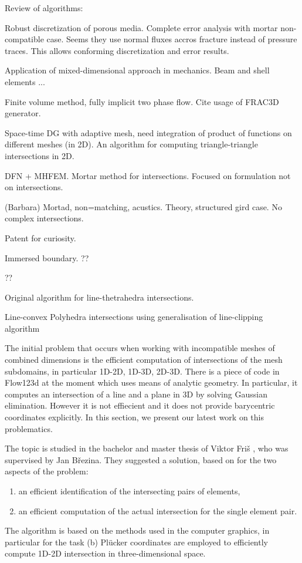 \documentclass{elsarticle}
\newcommand{\plucker}{Pl\"{u}cker }
\begin{document}
Review of algorithms: \cite{gander_algorithm_2009}
 

\cite{boon_robust_2016} Robust discretization of porous media. Complete error analysis with mortar non-compatible case. Seems they use normal fluxes accros
fracture instead of pressure traces. This allows conforming discretization and error results.


\cite{bournival_mesh-geometry_2008} Application of mixed-dimensional approach in mechanics. Beam and shell elements ...

\cite{reichenberger_mixed-dimensional_2006} Finite volume method, fully implicit two phase flow. Cite usage of FRAC3D generator. 

\cite{sladkova_bakalarka} Space-time DG with adaptive mesh, need integration of product of functions on different meshes (in 2D). An algorithm 
for computing triangle-triangle intersections in 2D.

\cite{pichot_generalized_2012} DFN + MHFEM. Mortar method for intersections. Focused on formulation not on intersections. 

\cite{flemisch_non-matching_2012} (Barbara) Mortad, non=matching, acustics. Theory, structured gird case. No complex intersections.

\cite{mustapha_hybrid_2014} Patent for curiosity.

\cite{mittal_immersed_2005} Immersed boundary. ??

\cite{owen_survey_1998} ??

\cite{kuznetsov_overlapping_1998}

\cite{platis_fast_2003} Original algorithm for line-thetrahedra intersections.

\cite{haines_fast_1991} Line-convex Polyhedra intersections using generalisation of line-clipping algorithm



The initial problem that occurs when working with incompatible meshes of combined dimensions is the efficient 
computation of intersections of the mesh subdomains, in particular 1D-2D, 1D-3D, 2D-3D.
There is a piece of code in Flow123d at the moment which uses means of analytic geometry. In particular, it computes 
an intersection of a line and a plane in 3D by solving Gaussian elimination. However it is not effiecient
and it does not provide barycentric coordinates explicitly.
In this section, we present our latest work on this problematics.

The topic is studied in the bachelor and master thesis of Viktor Fri{\v s} \cite{fris_dp_2015}, who was supervised by 
Jan B{\v r}ezina.
They suggested a solution, based on \cite{yuan_efficient_2003} for the two aspects of the problem: 
\begin{enumerate}[itemsep=-3pt]
\item an efficient identification of the intersecting pairs of elements,
\item an efficient computation of the actual intersection for the single element pair.
\end{enumerate}
The algorithm is based on the methods used in the computer graphics, in particular for the task (b) \plucker
coordinates are employed to efficiently compute 1D-2D intersection in three-dimensional space.
\end{document}
